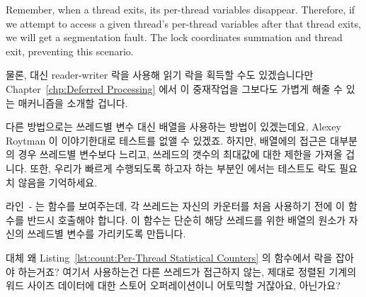 \begin{lineref}
{	Remember, when a thread exits, its per-thread variables disappear.
	Therefore, if we attempt to access a given thread's per-thread
	variables after that thread exits, we will get a segmentation
	fault.
	The lock coordinates summation and thread exit, preventing this
	scenario.
	\fi

	물론, 대신 reader-writer 락을 사용해 읽기 락을 획득할 수도 있겠습니다만
	Chapter~\ref{chp:Deferred Processing} 에서 이 중재작업을 그보다도
	가볍게 해줄 수 있는 매커니즘을 소개할 겁니다.

	다른 방법으로는 쓰레드별 변수 대신 배열을 사용하는 방법이 있겠는데요,
	Alexey Roytman 이 이야기한대로  테스트를 없앨 수 있겠죠.
	하지만, 배열에의 접근은 대부분의 경우 쓰레드별 변수보다 느리고,
	쓰레드의 갯수의 최대값에 대한 제한을 가져올 겁니다.
	또한, 우리가 빠르게 수행되도록 하고자 하는 부분인 
	에서는 테스트도 락도 필요치 않음을 기억하세요.

} \QuickQuizEnd

\begin{lineref}
라인~- 는  함수를 보여주는데, 각
쓰레드는 자신의 카운터를 처음 사용하기 전에 이 함수를 반드시 호출해야 합니다.
이 함수는 단순히 해당 쓰레드를 위한  배열의 원소가 자신의
쓰레드별  변수를 가리키도록 만듭니다.

\end{lineref}

\QuickQuiz{}
	대체 왜 Listing~\ref{lst:count:Per-Thread Statistical Counters} 의
	 함수에서 락을 잡아야 하는거죠?
	여기서 사용하는건 다른 쓰레드가 접근하지 않는, 제대로 정렬된 기계의
	워드 사이즈 데이터에 대한 스토어 오퍼레이션이니 어토믹할 거잖아요,
	아닌가요?
	\iffalse


\end{lineref}
